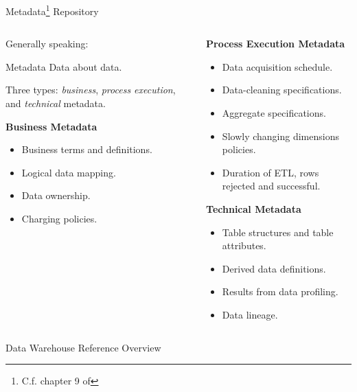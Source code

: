 \begin{frame}{Metadata\footnote{C.f. chapter 9 of } Repository}
	\begin{columns}
		\begin{column}{0.5\textwidth}
			Generally speaking:

			\begin{block}{Metadata}
				Data about data.
			\end{block}

			Three types: \textit{business}, \textit{process execution}, and
			\textit{technical} metadata.

			\vspace*{0.8em}
			\textbf{Business Metadata}
			\begin{itemize}
				\item Business terms and definitions.
				\item Logical data mapping.
				\item Data ownership.
				\item Charging policies.
			\end{itemize}
		\end{column}

		\begin{column}{0.5\textwidth}
			\textbf{Process Execution Metadata}
			\begin{itemize}
				\item Data acquisition schedule.
				\item Data-cleaning specifications.
				\item Aggregate specifications.
				\item Slowly changing dimensions policies.
				\item Duration of ETL, rows rejected and successful.
			\end{itemize}
			\textbf{Technical Metadata}
			\begin{itemize}
				\item Table structures and table attributes.
				\item Derived data definitions.
				\item Results from data profiling.
				\item Data lineage.
			\end{itemize}

		\end{column}
	\end{columns}
\end{frame}

\begin{frame}{Data Warehouse Reference Overview}
	
\end{frame}
